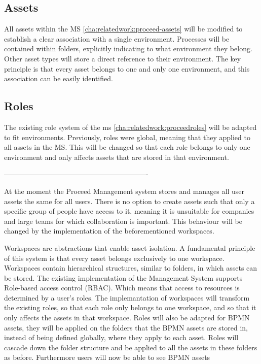 \subsection{Assets}

All assets within the MS \ref{cha:relatedwork:proceed-assets}
will be modified to establish a clear association with a single environment.
Processes will be contained within folders, explicitly indicating to what environment they
belong.
Other asset types will store a direct reference to their environment.
The key principle is that every asset belongs to one and only one environment, and this
association can be easily identified.


\subsection{Roles}

The existing role system of the ms \ref{cha:relatedwork:proceedroles} will be adapted to
fit environments.
Previously, roles were global, meaning that they applied to all assets in the MS.
This will be changed so that each role belongs to only one environment and only affects 
assets that are stored in that environment.




-------------------------------------------------------------



At the moment the Proceed Management system stores and manages all user assets the same for all users.
There is no option to create assets such that only a specific group of people have access to it, meaning it is unsuitable for companies and large teams for which collaboration is important.
This behaviour will be changed by the implementation of the beforementioned workspaces.

Workspaces are abstractions that enable asset isolation.
A fundamental principle of this system is that every asset belongs exclusively to one workspace.
Workspaces contain hierarchical structures, similar to folders, in which assets can be stored.
The existing implementation of the Management System supports Role-based access control (RBAC).
Which means that access to resources is determined by a user's roles.
The implemantation of workspaces will transform the existing roles, so that each role only belongs to one workspace, and so that it only affects the assets in that workspace.
Roles will also be adapted for BPMN assets, they will be applied on the folders that the BPMN assets are stored in, instead of being defined globally, where they apply to each asset.
Roles will cascade down the folder structure and be applied to all the assets in these folders as before.
Furthermore users will now be able to see BPMN assets 

